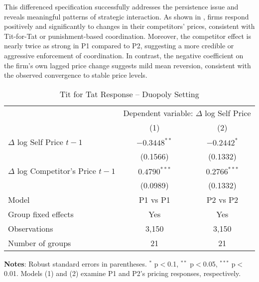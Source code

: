 This differenced specification successfully addresses the persistence issue and reveals meaningful patterns of strategic interaction. As shown in , firms respond positively and significantly to changes in their competitors’ prices, consistent with Tit-for-Tat or punishment-based coordination. Moreover, the competitor effect is nearly twice as strong in P1 compared to P2, suggesting a more credible or aggressive enforcement of coordination. In contrast, the negative coefficient on the firm’s own lagged price change suggests mild mean reversion, consistent with the observed convergence to stable price levels. 

\begin{table}[htpb!]
    \centering
    \caption{Tit for Tat Response – Duopoly Setting}
    \label{tab:fe_duopoly}
    \begin{threeparttable}
    {\small
    \begin{tabular}{lcc}
    \toprule
    & \multicolumn{2}{c}{Dependent variable: $\Delta$ log Self Price} \\
    \cmidrule(lr){2-3}
    & (1) & (2) \\
    \midrule
    $\Delta$ log Self Price $t-1$         & $-0.3448^{**}$ & $-0.2442^{*}$  \\
                             & (0.1566)       & (0.1332)       \\
    $\Delta$ log Competitor's Price $t-1$ & $0.4790^{***}$ & $0.2766^{***}$ \\
                             & (0.0989)       & (0.1332)       \\
    \midrule
    Model                    & P1 vs P1       & P2 vs P2       \\          
    Group fixed effects      & Yes            & Yes            \\
    \midrule
    Observations             & 3,150          & 3,150          \\
    Number of groups         & 21             & 21             \\
    \bottomrule
    \end{tabular}
    }
    \begin{tablenotes}[flushleft]
    \footnotesize
    \item \textbf{Notes}: Robust standard errors in parentheses. $^{*}$ p$<$0.1, $^{**}$ p$<$0.05, $^{***}$ p$<$0.01. Models (1) and (2) examine P1 and P2's pricing responses, respectively.
    \end{tablenotes}
    \end{threeparttable}
\end{table}

